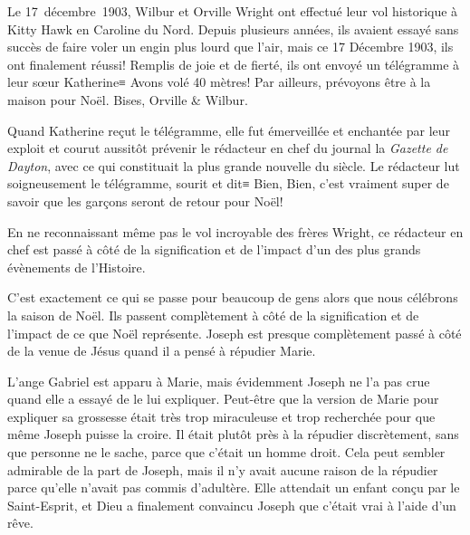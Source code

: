

Le 17~décembre~1903, Wilbur et Orville Wright ont effectué leur vol historique à Kitty Hawk en Caroline du Nord. Depuis plusieurs années, ils avaient essayé sans succès de faire voler un engin plus lourd que l'air, mais ce 17 Décembre 1903, ils ont finalement réussi! Remplis de joie et de fierté, ils ont envoyé un télégramme à leur sœur Katherine≡ \og Avons volé 40 mètres! Par ailleurs, prévoyons être à la maison pour Noël. Bises, Orville \& Wilbur. \fg{}

Quand Katherine reçut le télégramme, elle fut émerveillée et enchantée par leur exploit et courut aussitôt prévenir le rédacteur en chef du journal la \emph{Gazette de Dayton}, avec ce qui constituait la plus grande nouvelle du siècle. Le rédacteur lut soigneusement le télégramme, sourit et dit≡ \og Bien, Bien, c'est vraiment super de savoir que les garçons seront de retour pour Noël! \fg{}

En ne reconnaissant même pas le vol incroyable des frères Wright, ce rédacteur en chef est passé à côté de la signification et de l'impact d'un des plus grands évènements de l'Histoire.

C'est exactement ce qui se passe pour beaucoup de gens alors que nous célébrons la saison de Noël. Ils passent complètement à côté de la signification et de l'impact de ce que Noël représente. Joseph est presque complètement passé à côté de la venue de Jésus quand il a pensé à répudier Marie.

L'ange Gabriel est apparu à Marie, mais évidemment Joseph ne l'a pas crue quand elle a essayé de le lui expliquer. Peut-être que la version de Marie pour expliquer sa grossesse était très trop miraculeuse et trop recherchée pour que même Joseph puisse la croire. Il était plutôt près à la répudier discrètement, sans que personne ne le sache, parce que c'était un homme droit. Cela peut sembler admirable de la part de Joseph, mais il n'y avait aucune raison de la répudier parce qu'elle n'avait pas commis d'adultère. Elle attendait un enfant conçu par le Saint-Esprit, et Dieu a finalement convaincu Joseph que c'était vrai à l'aide d'un rêve.

